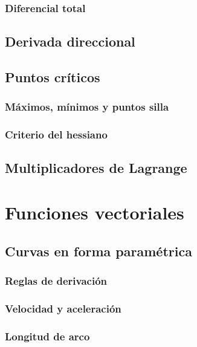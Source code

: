 \documentclass[12pt, fleqn]{report}                             %
\theoremstyle{break}                                            %
\begin{document}
            \subsection{Diferencial total}
            
        \section{Derivada direccional}
        
        \section{Puntos críticos}
        
            \subsection{Máximos, mínimos y puntos silla}
            
            \subsection{Criterio del hessiano}
            
        \section{Multiplicadores de Lagrange}


    \chapter{Funciones vectoriales}
    
        \section{Curvas en forma paramétrica}
        
            \subsection{Reglas de derivación}
            
            \subsection{Velocidad y aceleración}
        
            \subsection{Longitud de arco}
            
\end{document}
